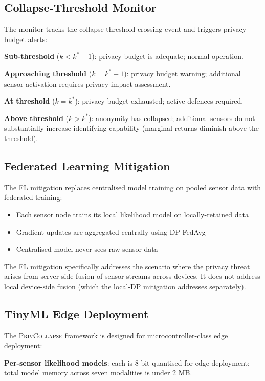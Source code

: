 \documentclass[sigconf,nonacm]{acmart}
\begin{document}
\subsection{Collapse-Threshold Monitor}

The monitor tracks the collapse-threshold crossing event and
triggers privacy-budget alerts:

\textbf{Sub-threshold} ($k < k^* - 1$): privacy budget is
adequate; normal operation.

\textbf{Approaching threshold} ($k = k^* - 1$): privacy budget
warning; additional sensor activation requires privacy-impact
assessment.

\textbf{At threshold} ($k = k^*$): privacy-budget exhausted;
active defences required.

\textbf{Above threshold} ($k > k^*$): anonymity has collapsed;
additional sensors do not substantially increase identifying
capability (marginal returns diminish above the threshold).

\subsection{Federated Learning Mitigation}

The FL mitigation replaces centralised model training on pooled
sensor data with federated training:

\begin{itemize}
  \item Each sensor node trains its local likelihood model on
        locally-retained data
  \item Gradient updates are aggregated centrally using
        DP-FedAvg~\cite{abadi2016deep}
  \item Centralised model never sees raw sensor data
\end{itemize}

The FL mitigation specifically addresses the scenario where the
privacy threat arises from server-side fusion of sensor streams
across devices. It does not address local device-side fusion
(which the local-DP mitigation addresses separately).

\subsection{TinyML Edge Deployment}

The \textsc{PrivCollapse} framework is designed for
microcontroller-class edge deployment:

\textbf{Per-sensor likelihood models}: each is 8-bit quantised
for edge deployment; total model memory across seven modalities
is under 2 MB.
\end{document}
